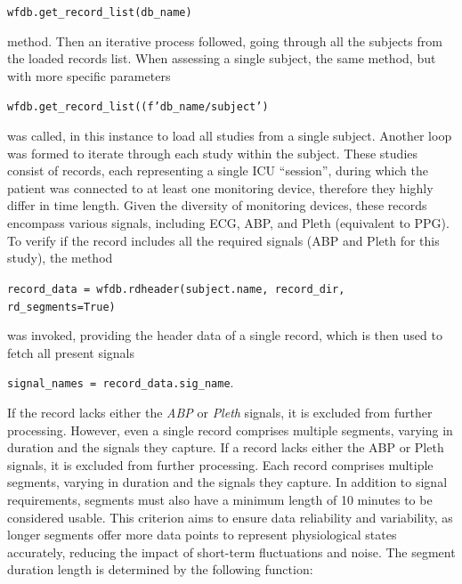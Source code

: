 \vspace{0.1cm}
{\centering \texttt{wfdb.get\_record\_list(db\_name)}\par}
\vspace{0.1cm}

\noindent method.
Then an iterative process followed, going through all the subjects from the loaded records list.
When assessing a single subject, the same method, but with more specific parameters

\vspace{0.1cm}
{\centering \texttt{wfdb.get\_record\_list((f'{db\_name}/{subject}')}\par}
\vspace{0.1cm}

\noindent was called, in this instance to load all studies from a single subject.
Another loop was formed to iterate through each study within the subject.
These studies consist of records, each representing a single ICU \enquote{session}, during which the patient was connected to at least one monitoring device, therefore they highly differ in time length.
Given the diversity of monitoring devices, these records encompass various signals, including ECG, ABP, and Pleth (equivalent to PPG).
To verify if the record includes all the required signals (ABP and Pleth for this study), the method

\vspace{0.1cm}
{\centering \texttt{record\_data = wfdb.rdheader(subject.name, record\_dir, rd\_segments=True)}\par}
\vspace{0.1cm}

\noindent was invoked, providing the header data of a single record, which is then used to fetch all present signals

\vspace{0.1cm}
{\centering \texttt{signal\_names = record\_data.sig\_name}.\par}
\vspace{0.1cm}

\noindent If the record lacks either the \textit{ABP} or \textit{Pleth} signals, it is excluded from further processing.
However, even a single record comprises multiple segments, varying in duration and the signals they capture.
If a record lacks either the ABP or Pleth signals, it is excluded from further processing.
Each record comprises multiple segments, varying in duration and the signals they capture.
In addition to signal requirements, segments must also have a minimum length of 10 minutes to be considered usable.
This criterion aims to ensure data reliability and variability, as longer segments offer more data points to represent physiological states accurately, reducing the impact of short-term fluctuations and noise.
The segment duration length is determined by the following function:

